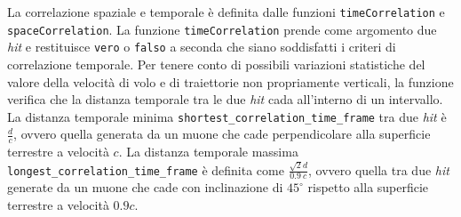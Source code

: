 \documentclass[../main.tex]{subfiles}
\begin{document}
La correlazione spaziale e temporale è definita dalle funzioni \texttt{timeCorrelation} e \texttt{spaceCorrelation}.
La funzione \texttt{timeCorrelation} prende come argomento due \emph{hit} e restituisce \texttt{vero} o \texttt{falso} a seconda che siano soddisfatti i criteri di correlazione temporale.
Per tenere conto di possibili variazioni statistiche del valore della velocità di volo e di traiettorie non propriamente verticali, la funzione verifica che la distanza temporale tra le due \emph{hit} cada all'interno di un intervallo.
La distanza temporale minima \texttt{shortest\_correlation\_time\_frame} tra due \emph{hit} è $\frac{d}{c}$, ovvero quella generata da un muone che cade perpendicolare alla superficie terrestre a velocità $c$.
La distanza temporale massima \texttt{longest\_correlation\_time\_frame} è definita come $\frac{\sqrt{2}d}{0.9\ c}$, ovvero quella tra due \emph{hit} generate da un muone che cade con inclinazione di $45^\circ$ rispetto alla superficie terrestre a velocità $0.9c$.


\end{document}
